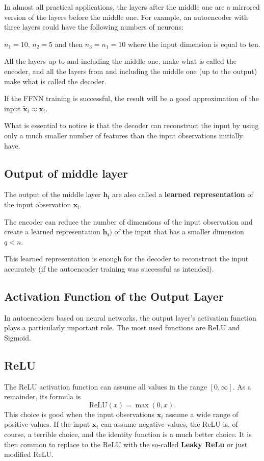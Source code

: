 \documentclass[%
oneside,                 %
final,                   %
10pt]{article}
\begin{document}
In almost all practical applications,
the layers after the middle one are a mirrored version of the layers before the middle one.
For example, an autoencoder with three layers could have the following numbers of neurons:

$n_{1} = 10$, $n_{2} = 5$ and then $n_{3} = n_{1} = 10$ where the input dimension is equal to ten.

All the layers up to and including the middle one, make what is called the encoder, and all the layers from and including
the middle one (up to the output) make what is called the decoder.

If the FFNN training is successful, the result will
be a good approximation of the input $\tilde{\mathbf{x}}_{i}\approx\mathbf{x}_{i}$.

What is essential to notice is that the decoder can reconstruct the
input by using only a much smaller number of features than the input
observations initially have.

\subsection{Output of middle layer}

The output of the middle layer
$\mathbf{h}_{\mathbf{i}}$ are also called a \textbf{learned representation} of the input observation $\mathbf{x}_{i}$.

The encoder can reduce the number of dimensions of the input
observation and create a learned representation
$\mathbf{h}_{\mathbf{i}}\mathbf{) }$ of the input that has a smaller
dimension $q<n$.

This learned representation is enough for the decoder to reconstruct
the input accurately (if the autoencoder training was successful as
intended).

\subsection{Activation Function of the Output Layer}

In autoencoders based on neural networks, the output layer's
activation function plays a particularly important role.  The most
used functions are ReLU and Sigmoid. 

\subsection{ReLU}

The  ReLU activation function can assume all values in the range $\left[0,\infty\right]$. As a remainder, its formula is
\[
\textrm{ReLU}\left(x\right) = \max\left(0,x\right).
\]
This choice is good when the input observations \(\mathbf{x}_{i}\) assume a wide range of positive values.
If the input $\mathbf{x}_{i}$ can assume negative values, the ReLU is, of course, a terrible choice, and the identity function is a much better choice. It is then common to replace to the ReLU with the so-called \textbf{Leaky ReLu} or just modified ReLU.
\end{document}
